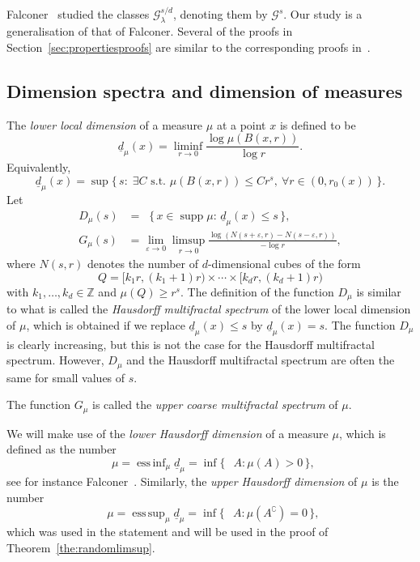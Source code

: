 \documentclass[11pt]{article}
\theoremstyle{definition}
\numberwithin{equation}{section}
\numberwithin{figure}{section}
\numberwithin{table}{section}
\DeclareMathOperator{\dimh}{dim_H}
\DeclareMathOperator{\ldimh}{\underline{dim}_H}
\DeclareMathOperator{\udimh}{\overline{dim}_H}
\DeclareMathOperator{\supp}{supp}
\DeclareMathOperator*{\essinf}{ess\,inf}
\DeclareMathOperator*{\esssup}{ess\,sup}
\let\oldexists\exists
\renewcommand*{\exists}{\mathrel{\oldexists}}
\let\oldforall\forall
\renewcommand*{\forall}{\mathrel{\oldforall}}
\begin{document}
Falconer~\cite{falconer1, falconer2} studied the classes $\mathscr{G}_\lambda^{s/d}$, denoting them by $\mathscr{G}^s$. Our study is a generalisation of that of Falconer. Several of the proofs in Section~\ref{sec:propertiesproofs} are similar to the corresponding proofs in~\cite{falconer2}.


\subsection{Dimension spectra and dimension of measures} \label{ssec:dimensiondefinitions}

The {\em lower local dimension} of a measure $\mu$ at a point $x$ is defined to be
\[
\underline{d}_\mu (x) = \liminf_{r \to 0} \frac{\log \mu (B(x,r))}{\log r}.
\]
Equivalently,
\[
\underline{d}_\mu (x) = \sup \{\, s :\; \exists C \text{ s.t. } \mu (B(x,r)) \leq C r^s, \ \forall r \in (0, r_0 (x)) \,\}.
\]
Let
\begin{align*}
D_\mu (s) &= \dimh \{\, x \in \supp \mu : \, \underline{d}_\mu (x)
\leq s \,\},\\
G_\mu (s) &= \lim_{\varepsilon \to 0} \limsup_{r \to 0} \frac{\log (N (s + \varepsilon, r) - N (s - \varepsilon, r))}{- \log r},
\end{align*}
where $N (s, r)$ denotes the number of $d$-dimensional cubes of the form
\[
Q = [k_1 r, (k_1+1) r) \times \cdots \times [k_d r, (k_d+1) r)
\]
with $k_1, \ldots, k_d \in \mathbb{Z}$ and $\mu (Q) \geq r^s$. The definition of the function $D_\mu$ is similar to what is called the
\emph{Hausdorff multifractal spectrum} of the lower local dimension of $\mu$, which is obtained if we replace $\underline{d}_\mu (x) \leq s$ by $\underline{d}_\mu (x) = s$. The function $D_\mu$ is clearly increasing, but this is not the case for the Hausdorff multifractal spectrum. However, $D_\mu$ and the Hausdorff multifractal spectrum are often the same for small values of $s$.

The function $G_\mu$ is called the \emph{upper coarse multifractal spectrum} of $\mu$.

We will make use of the {\em lower Hausdorff dimension} of a measure $\mu$, which is defined as the number
\[
\ldimh \mu = \essinf_{\mu} \underline{d}_\mu = \inf \{\, \dimh A :
\mu (A) > 0 \,\},
\]
see for instance Falconer~\cite[Proposition~10.2]{falconertechniques}. Similarly, the {\em upper Hausdorff dimension} of $\mu$ is the number
\[
\udimh \mu = \esssup_{\mu} \underline{d}_\mu = \inf \{\, \dimh A :
\mu (A^\complement) = 0 \,\},
\]
which was used in the statement and will be used in the proof of Theorem~\ref{the:randomlimsup}.
\end{document}
